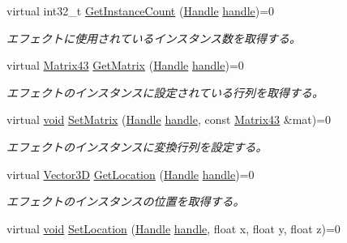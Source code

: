 \begin{DoxyCompactItemize}
virtual int32\+\_\+t \mbox{\hyperlink{class_effekseer_1_1_manager_a4e4831b6514c683cd9cabf5cfe1103ab}{Get\+Instance\+Count}} (\mbox{\hyperlink{namespace_effekseer_afba58b8d812da862190e9bbfc040824a}{Handle}} \mbox{\hyperlink{namespace_effekseer_afd99b336b206999bdcca3e431648efbc}{handle}})=0
\begin{DoxyCompactList}\small\item\em エフェクトに使用されているインスタンス数を取得する。 \end{DoxyCompactList}\item 
virtual \mbox{\hyperlink{struct_effekseer_1_1_matrix43}{Matrix43}} \mbox{\hyperlink{class_effekseer_1_1_manager_aa5d7a667c75a81bc30f65483535b6a7f}{Get\+Matrix}} (\mbox{\hyperlink{namespace_effekseer_afba58b8d812da862190e9bbfc040824a}{Handle}} \mbox{\hyperlink{namespace_effekseer_afd99b336b206999bdcca3e431648efbc}{handle}})=0
\begin{DoxyCompactList}\small\item\em エフェクトのインスタンスに設定されている行列を取得する。 \end{DoxyCompactList}\item 
virtual \mbox{\hyperlink{namespace_effekseer_ab34c4088e512200cf4c2716f168deb56}{void}} \mbox{\hyperlink{class_effekseer_1_1_manager_a69d0768ed69c30d3993ececa6159c4dd}{Set\+Matrix}} (\mbox{\hyperlink{namespace_effekseer_afba58b8d812da862190e9bbfc040824a}{Handle}} \mbox{\hyperlink{namespace_effekseer_afd99b336b206999bdcca3e431648efbc}{handle}}, const \mbox{\hyperlink{struct_effekseer_1_1_matrix43}{Matrix43}} \&mat)=0
\begin{DoxyCompactList}\small\item\em エフェクトのインスタンスに変換行列を設定する。 \end{DoxyCompactList}\item 
virtual \mbox{\hyperlink{struct_effekseer_1_1_vector3_d}{Vector3D}} \mbox{\hyperlink{class_effekseer_1_1_manager_adef5e990faa38e39b9aa57f03f485747}{Get\+Location}} (\mbox{\hyperlink{namespace_effekseer_afba58b8d812da862190e9bbfc040824a}{Handle}} \mbox{\hyperlink{namespace_effekseer_afd99b336b206999bdcca3e431648efbc}{handle}})=0
\begin{DoxyCompactList}\small\item\em エフェクトのインスタンスの位置を取得する。 \end{DoxyCompactList}\item 
virtual \mbox{\hyperlink{namespace_effekseer_ab34c4088e512200cf4c2716f168deb56}{void}} \mbox{\hyperlink{class_effekseer_1_1_manager_aa35fc7968dadeb82e58bb0c472dfb8b1}{Set\+Location}} (\mbox{\hyperlink{namespace_effekseer_afba58b8d812da862190e9bbfc040824a}{Handle}} \mbox{\hyperlink{namespace_effekseer_afd99b336b206999bdcca3e431648efbc}{handle}}, float x, float y, float z)=0

\end{DoxyCompactItemize}
